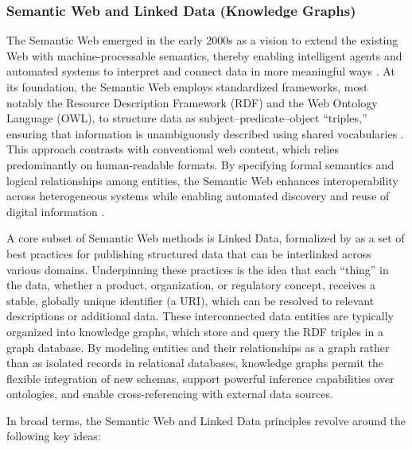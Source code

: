 \subsubsection*{Semantic Web and Linked Data (Knowledge Graphs)}
The Semantic Web emerged in the early 2000s as a vision to extend the existing Web with machine-processable semantics, thereby enabling intelligent agents and automated systems to interpret and connect data in more meaningful ways \autocite{BernersLee.2001}. At its foundation, the Semantic Web employs standardized frameworks, most notably the Resource Description Framework (RDF) and the Web Ontology Language (OWL), to structure data as subject–predicate–object “triples,” ensuring that information is unambiguously described using shared vocabularies \autocite{Antoniou.2008, WorldWideWebConsortium.2014}. This approach contrasts with conventional web content, which relies predominantly on human-readable formats. By specifying formal semantics and logical relationships among entities, the Semantic Web enhances interoperability across heterogeneous systems while enabling automated discovery and reuse of digital information \autocite{Hogan.2022}.

A core subset of Semantic Web methods is Linked Data, formalized by \textcite{BernersLee.2006} as a set of best practices for publishing structured data that can be interlinked across various domains. Underpinning these practices is the idea that each “thing” in the data, whether a product, organization, or regulatory concept, receives a stable, globally unique identifier (a URI), which can be resolved to relevant descriptions or additional data. These interconnected data entities are typically organized into knowledge graphs, which store and query the RDF triples in a graph database. By modeling entities and their relationships as a graph rather than as isolated records in relational databases, knowledge graphs permit the flexible integration of new schemas, support powerful inference capabilities over ontologies, and enable cross-referencing with external data sources. \autocite{Heath.2011, Hogan.2022, BernersLee.2006}

In broad terms, the Semantic Web and Linked Data principles revolve around the following key ideas:

